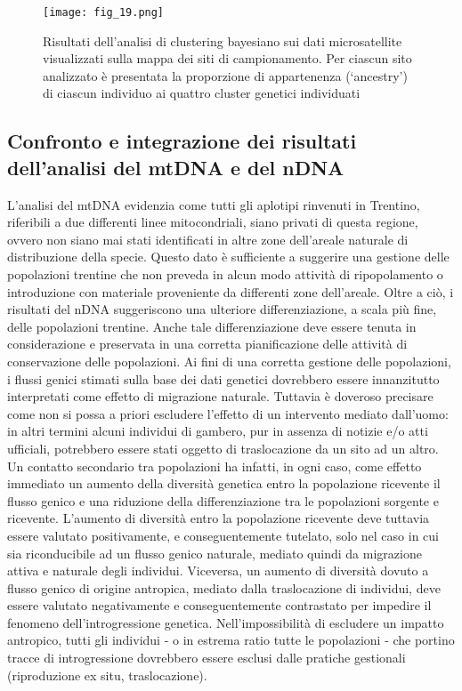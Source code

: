 \documentclass[11pt,a4paper,italian,twoside,openany]{memoir}
\begin{document}
\begin{figure}[H]
  \centering
  \texttt{[image: fig\_19.png]}
  \caption{Risultati dell'analisi di clustering bayesiano sui dati microsatellite visualizzati sulla mappa dei siti di campionamento. Per ciascun sito analizzato è presentata la proporzione di appartenenza (‘ancestry') di ciascun individuo ai quattro cluster genetici individuati}
  \label{fig_19}
\end{figure}


\subsection{Confronto e integrazione dei risultati dell'analisi del mtDNA e del nDNA}
L'analisi del mtDNA evidenzia come tutti gli aplotipi rinvenuti in Trentino, riferibili a due differenti linee mitocondriali, siano privati di questa regione, ovvero non siano mai stati identificati in altre zone dell'areale naturale di distribuzione della specie. Questo dato è sufficiente a suggerire una gestione delle popolazioni trentine che non preveda in alcun modo attività di ripopolamento o introduzione con materiale proveniente da differenti zone dell'areale. Oltre a ciò, i risultati del nDNA suggeriscono una ulteriore differenziazione, a scala più fine, delle popolazioni trentine. Anche tale differenziazione deve essere tenuta in considerazione e preservata in una corretta pianificazione delle attività di conservazione delle popolazioni. 
Ai fini di una corretta gestione delle popolazioni, i flussi genici stimati sulla base dei dati genetici dovrebbero essere innanzitutto interpretati come effetto di migrazione naturale. Tuttavia è doveroso precisare come non si possa a priori escludere l'effetto di un intervento mediato dall'uomo: in altri termini alcuni individui di gambero, pur in assenza di notizie e/o atti ufficiali, potrebbero essere stati oggetto di traslocazione da un sito ad un altro. Un contatto secondario tra popolazioni ha infatti, in ogni caso, come effetto immediato un aumento della diversità genetica entro la popolazione ricevente il flusso genico e una riduzione della differenziazione tra le popolazioni sorgente e ricevente. L'aumento di diversità entro la popolazione ricevente deve tuttavia essere valutato positivamente, e conseguentemente tutelato, solo nel caso in cui sia riconducibile ad un flusso genico naturale, mediato quindi da migrazione attiva e naturale degli individui. Viceversa, un aumento di diversità dovuto a flusso genico di origine antropica, mediato dalla traslocazione di individui, deve essere valutato negativamente e conseguentemente contrastato per impedire il fenomeno dell'introgressione genetica. Nell'impossibilità di escludere un impatto antropico, tutti gli individui - o in estrema ratio tutte le popolazioni - che portino tracce di introgressione dovrebbero essere esclusi dalle pratiche gestionali (riproduzione ex situ, traslocazione).
\end{document}
